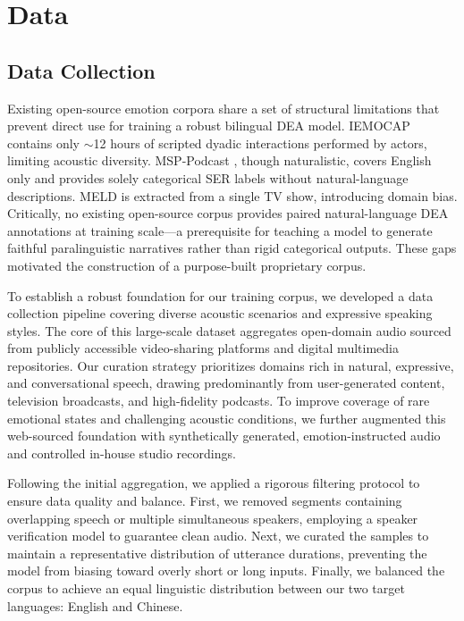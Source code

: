 \section{Data}

\subsection{Data Collection}

Existing open-source emotion corpora share a set of structural limitations that prevent direct use for training a robust bilingual DEA model. IEMOCAP \cite{IEMOCAP} contains only $\sim$12 hours of scripted dyadic interactions performed by actors, limiting acoustic diversity. MSP-Podcast \cite{MSP-Podcast}, though naturalistic, covers English only and provides solely categorical SER labels without natural-language descriptions. MELD \cite{MELD} is extracted from a single TV show, introducing domain bias. Critically, no existing open-source corpus provides paired natural-language DEA annotations at training scale---a prerequisite for teaching a model to generate faithful paralinguistic narratives rather than rigid categorical outputs. These gaps motivated the construction of a purpose-built proprietary corpus.

To establish a robust foundation for our training corpus, we developed a data collection pipeline covering diverse acoustic scenarios and expressive speaking styles. The core of this large-scale dataset aggregates open-domain audio sourced from publicly accessible video-sharing platforms and digital multimedia repositories. Our curation strategy prioritizes domains rich in natural, expressive, and conversational speech, drawing predominantly from user-generated content, television broadcasts, and high-fidelity podcasts. To improve coverage of rare emotional states and challenging acoustic conditions, we further augmented this web-sourced foundation with synthetically generated, emotion-instructed audio and controlled in-house studio recordings.

Following the initial aggregation, we applied a rigorous filtering protocol to ensure data quality and balance. First, we removed segments containing overlapping speech or multiple simultaneous speakers, employing a speaker verification model \cite{ERes2NetV2} to guarantee clean audio. Next, we curated the samples to maintain a representative distribution of utterance durations, preventing the model from biasing toward overly short or long inputs. Finally, we balanced the corpus to achieve an equal linguistic distribution between our two target languages: English and Chinese.

